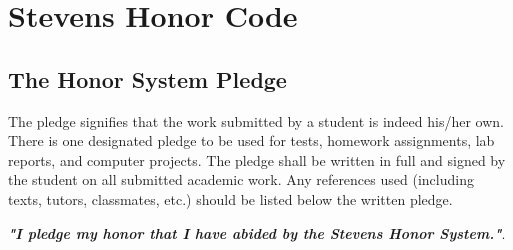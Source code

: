 \section{Stevens Honor Code}
\subsection{The Honor System Pledge}

The pledge signifies that the work submitted by a student is indeed his/her 
own. There is one designated pledge to be used for tests, homework assignments, 
lab reports, and computer projects. The pledge shall be written in full and 
signed by the student on all submitted academic work. Any references 
used (including texts, tutors, classmates, etc.) should be listed below 
the written pledge. \newline

\textbf{\textit{"I pledge my honor that I have abided by the Stevens Honor System."}}.

